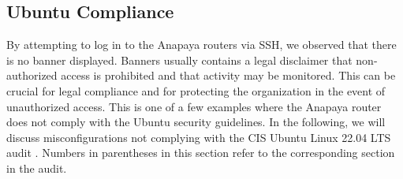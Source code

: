 \subsection{Ubuntu Compliance}
\label{sec:ubuntu-compliance}
By attempting to log in to the Anapaya routers via SSH, we observed that there is no banner displayed.
Banners usually contains a legal disclaimer that non-authorized access is prohibited and that activity may be monitored.
This can be crucial for legal compliance and for protecting the organization in the event of unauthorized access.
This is one of a few examples where the Anapaya router does not comply with the Ubuntu security guidelines.
In the following, we will discuss misconfigurations not complying with the CIS Ubuntu Linux 22.04 LTS audit \cite{cisUbuntuLinux2204LTS}.
Numbers in parentheses in this section refer to the corresponding section in the audit.

